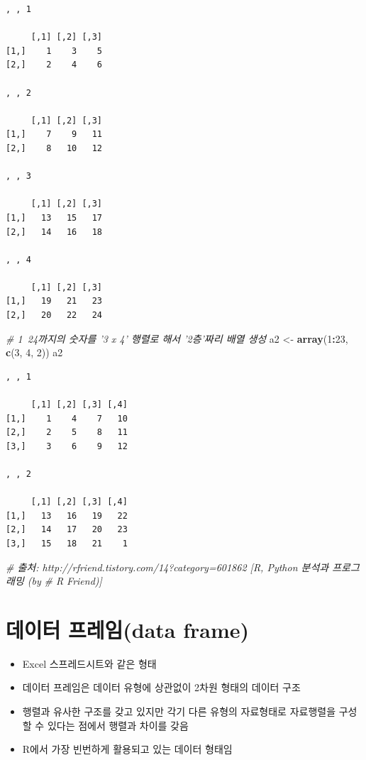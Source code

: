 \documentclass[11pt,a4paper]{book}
\newenvironment{Shaded}{\begin{snugshade}}{\end{snugshade}}
\newcommand{\KeywordTok}[1]{\textcolor[rgb]{0.13,0.29,0.53}{\textbf{#1}}}
\newcommand{\DecValTok}[1]{\textcolor[rgb]{0.00,0.00,0.81}{#1}}
\newcommand{\StringTok}[1]{\textcolor[rgb]{0.31,0.60,0.02}{#1}}
\newcommand{\CommentTok}[1]{\textcolor[rgb]{0.56,0.35,0.01}{\textit{#1}}}
\newcommand{\OperatorTok}[1]{\textcolor[rgb]{0.81,0.36,0.00}{\textbf{#1}}}
\newcommand{\NormalTok}[1]{#1}
\providecommand{\tightlist}{%
  \setlength{\itemsep}{0pt}\setlength{\parskip}{0pt}}
\theoremstyle{definition}
\theoremstyle{definition}
\theoremstyle{definition}
\theoremstyle{remark}
\begin{document}
\begin{verbatim}
, , 1

     [,1] [,2] [,3]
[1,]    1    3    5
[2,]    2    4    6

, , 2

     [,1] [,2] [,3]
[1,]    7    9   11
[2,]    8   10   12

, , 3

     [,1] [,2] [,3]
[1,]   13   15   17
[2,]   14   16   18

, , 4

     [,1] [,2] [,3]
[1,]   19   21   23
[2,]   20   22   24
\end{verbatim}

\begin{Shaded}
\begin{Highlighting}[]
\CommentTok{# 1~24까지의 숫자를 '3 x 4' 행렬로 해서 '2층'짜리 배열 생성}
\NormalTok{a2 <-}\StringTok{ }\KeywordTok{array}\NormalTok{(}\DecValTok{1}\OperatorTok{:}\DecValTok{23}\NormalTok{, }\KeywordTok{c}\NormalTok{(}\DecValTok{3}\NormalTok{, }\DecValTok{4}\NormalTok{, }\DecValTok{2}\NormalTok{))}
\NormalTok{a2}
\end{Highlighting}
\end{Shaded}

\begin{verbatim}
, , 1

     [,1] [,2] [,3] [,4]
[1,]    1    4    7   10
[2,]    2    5    8   11
[3,]    3    6    9   12

, , 2

     [,1] [,2] [,3] [,4]
[1,]   13   16   19   22
[2,]   14   17   20   23
[3,]   15   18   21    1
\end{verbatim}

\begin{Shaded}
\begin{Highlighting}[]
\CommentTok{# 출처: http://rfriend.tistory.com/14?category=601862 [R, Python 분석과 프로그래밍 (by}
\CommentTok{# R Friend)]}
\end{Highlighting}
\end{Shaded}

\normalsize

\section{데이터 프레임(data frame)}\label{-data-frame}

\begin{itemize}
\tightlist
\item
  Excel 스프레드시트와 같은 형태
\item
  데이터 프레임은 데이터 유형에 상관없이 2차원 형태의 데이터 구조
\item
  행렬과 유사한 구조를 갖고 있지만 각기 다른 유형의 자료형태로
  자료행렬을 구성할 수 있다는 점에서 행렬과 차이를 갖음
\item
  R에서 가장 빈번하게 활용되고 있는 데이터 형태임
\end{itemize}
\end{document}
